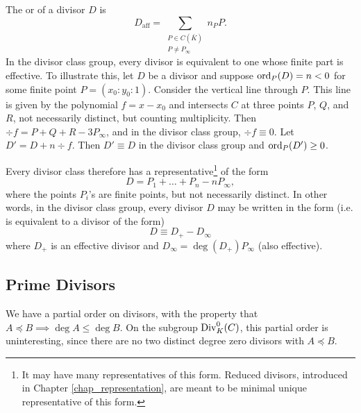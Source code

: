 The  or  of a divisor $D$ is
\[ D_{\text{aff}} = \sum_{\substack{P \in C(\bar K) \\ P \neq P_\infty}} n_P P. \]
In the divisor class group, every divisor is equivalent to one whose finite part is effective.
To illustrate this, let $D$ be a divisor and suppose $\operatorname{ord}_P(D) = n < 0$ for some finite point $P = (x_0 : y_0 : 1)$.
Consider the vertical line through $P$.
This line is given by the polynomial $f = x - x_0$ and intersects $C$ at three points $P$, $Q$, and $R$,
not necessarily distinct, but counting multiplicity.
Then $\div f = P + Q + R - 3P_\infty$, and in the divisor class group, $\div f \equiv 0$.
Let $D' = D + n \div f$.
Then $D' \equiv D$ in the divisor class group and $\operatorname{ord}_P(D') \geq 0$.

Every divisor class therefore has a representative\footnote{
It may have many representatives of this form.
Reduced divisors, introduced in Chapter \ref{chap_representation},
are meant to be minimal unique representative of this form.}
of the form
  \[ D = P_1 + \ldots + P_n - nP_\infty, \]
where the points $P_i$'s are finite points, but not necessarily distinct.
In other words, in the divisor class group,
every divisor $D$ may be written in the form (i.e. is equivalent to a divisor of the form)
  \[ D \equiv D_+ - D_\infty \]
where $D_+$ is an effective divisor and $D_\infty = \deg(D_+)P_\infty$ (also effective).
\begin{comment}
Unless otherwise specified, we will assume that a divisor $D$ is of this form.
Since $D_\infty$ is determined uniquely by $D^+$,
we will furthermore drop the $D_\infty$ part and denote $D$ by its positive part only.
That is, if $D = P + Q + R - 3P_\infty$, we will instead write simply $D = P + Q + R$ and call $D$ a degree 3 divisor.
\end{comment}




\subsection{Prime Divisors}
\label{sec_prime_divisors}

We have a partial order on divisors, with the property that $A \preceq B \implies \deg A \leq \deg B$.
On the subgroup $\operatorname{Div}_K^0(C)$, this partial order is uninteresting,
since there are no two distinct degree zero divisors with $A \preceq B$.

